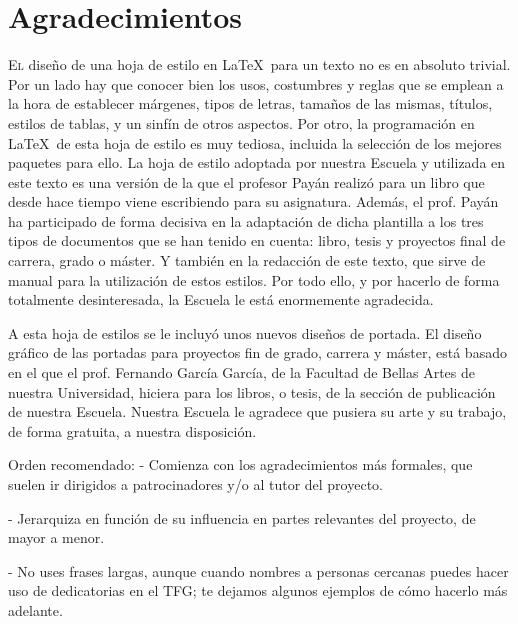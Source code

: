 \chapter*{Agradecimientos}
\pagestyle{empty}

\lettrine[lraise=-0.1, lines=2, loversize=0.25]{E}{l} diseño de una hoja de estilo en \LaTeX\ para un texto no es en absoluto trivial. Por un lado hay que conocer bien los usos, costumbres y reglas que se emplean a la hora de establecer márgenes, tipos de letras, tamaños de las mismas, títulos, estilos de tablas, y un sinfín de otros aspectos. Por otro, la programación en \LaTeX\ de esta hoja de estilo es muy tediosa, incluida la selección de los mejores paquetes para ello. La hoja de estilo adoptada por nuestra Escuela y utilizada en este texto es una versión de la que el profesor Payán realizó para un libro que desde hace tiempo viene escribiendo para su asignatura. Además, el prof. Payán ha participado de forma decisiva en la adaptación de dicha plantilla a los tres tipos de documentos que se han tenido en cuenta: libro, tesis y proyectos final de carrera, grado o máster. Y también en la redacción de este texto, que sirve de manual para la utilización de estos estilos. Por todo ello, y por hacerlo de forma totalmente desinteresada, la Escuela le está enormemente agradecida.

A esta hoja de estilos se le incluyó unos nuevos diseños de portada. El diseño gráfico de las portadas para proyectos fin de grado, carrera y máster, está basado en el que el prof. Fernando García García, de la Facultad de Bellas Artes de nuestra Universidad, hiciera para los libros, o tesis, de la sección de publicación de nuestra Escuela. Nuestra Escuela le agradece que pusiera su arte y su trabajo, de forma gratuita, a nuestra disposición.


Orden recomendado:
- Comienza con los agradecimientos más formales, que suelen ir dirigidos a patrocinadores y/o al tutor del proyecto.

- Jerarquiza en función de su influencia en partes relevantes del proyecto, de mayor a menor.

- No uses frases largas, aunque cuando nombres a personas cercanas puedes hacer uso de dedicatorias en el TFG; te dejamos algunos ejemplos de cómo hacerlo más adelante.

